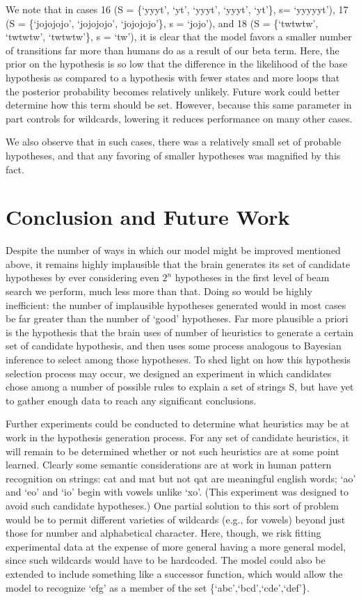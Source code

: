 \documentclass[10pt,letterpaper]{article}
\begin{document}
We note that in cases 16 (S = \{`yyyt', `yt', `yyyt', `yyyt', `yt'\}, s= `yyyyyt'), 17 (S = \{`jojojojo', `jojojojo', `jojojojo'\}, s = `jojo'), and 18 (S = \{`twtwtw', `twtwtw', `twtwtw'\}, s =  `tw'), it is clear that the model favors a smaller number of transitions far more than humans do as a result of our beta term. Here, the prior on the hypothesis is so low that the difference in the likelihood of the base hypothesis as compared to a hypothesis with fewer states and more loops that the posterior probability becomes relatively unlikely. Future work could better determine how this term should be set. However, because this same parameter in part controls for wildcards, lowering it reduces performance on many other cases. 

We also observe that in such cases, there was a relatively small set of probable hypotheses, and that any favoring of smaller hypotheses was magnified by this fact.

\section{Conclusion and Future Work}
Despite the number of ways in which our model might be improved mentioned above,  it remains highly implausible that the brain generates its set of candidate hypotheses by ever considering even $2^n$ hypotheses in the first level of beam search we perform, much less more than that. Doing so would be highly inefficient: the number of implausible hypotheses generated would in most cases be far greater than the number of `good' hypotheses. Far more plausible a priori is the hypothesis that the brain uses of number of heuristics to generate a certain set of candidate hypothesis, and then uses some process analogous to Bayesian inference to select among those hypotheses. To shed light on how this hypothesis selection process may occur, we designed an experiment in which candidates chose among a number of possible rules to explain a set of strings S, but have yet to gather enough data to reach any significant conclusions. 

Further experiments could be conducted to determine what heuristics may be at work in the hypothesis generation process. For any set of candidate heuristics, it will remain to be determined whether or not such heuristics are at some point learned. Clearly some semantic considerations are at work in human pattern recognition on strings: cat and mat but not qat are meaningful english words; `ao' and `eo' and `io' begin with vowels unlike `xo'. (This experiment was designed to avoid such candidate hypotheses.) One partial solution to this sort of problem would be to permit different varieties of wildcards (e.g., for vowels) beyond just those for number and alphabetical character. Here, though, we risk fitting experimental data at the expense of more general having a more general model, since such wildcards would have to be hardcoded. The model could also be extended to include something like a successor function, which would allow the model to recognize `efg' as a member of the set \{`abc',`bcd',`cde',`def'\}.
\end{document}

